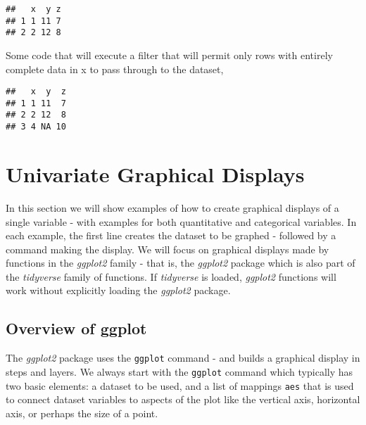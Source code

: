 \documentclass[
]{book}
\newenvironment{Shaded}{\begin{snugshade}}{\end{snugshade}}
\newcommand{\KeywordTok}[1]{\textcolor[rgb]{0.13,0.29,0.53}{\textbf{#1}}}
\newcommand{\NormalTok}[1]{#1}
\newcommand{\OperatorTok}[1]{\textcolor[rgb]{0.81,0.36,0.00}{\textbf{#1}}}
\newcommand{\StringTok}[1]{\textcolor[rgb]{0.31,0.60,0.02}{#1}}
\begin{document}
\begin{verbatim}
##   x  y z
## 1 1 11 7
## 2 2 12 8
\end{verbatim}

Some code that will execute a filter that will permit only rows with entirely complete data in x to pass through to the dataset,

\begin{Shaded}
\end{Shaded}

\begin{verbatim}
##   x  y  z
## 1 1 11  7
## 2 2 12  8
## 3 4 NA 10
\end{verbatim}

\hypertarget{UnivariateGraphicalDisplays}{%
\chapter{Univariate Graphical Displays}\label{UnivariateGraphicalDisplays}}

In this section we will show examples of how to create graphical displays of a single variable - with examples for both quantitative and categorical variables.
In each example, the first line creates the dataset to be graphed - followed by a command making the display. We will focus on graphical displays made by functions in the \emph{ggplot2} family - that is, the \emph{ggplot2} package which is also part of the \emph{tidyverse} family of functions. If \emph{tidyverse} is loaded, \emph{ggplot2} functions will work without explicitly loading the \emph{ggplot2} package.

\hypertarget{overview-of-ggplot}{%
\section{Overview of ggplot}\label{overview-of-ggplot}}

The \emph{ggplot2} package uses the \texttt{ggplot} command - and builds a graphical display in steps and layers. We always start with the \texttt{ggplot} command which typically has two basic elements: a dataset to be used, and a list of mappings \texttt{aes} that is used to connect dataset variables to aspects of the plot like the vertical axis, horizontal axis, or perhaps the size of a point.
\end{document}
